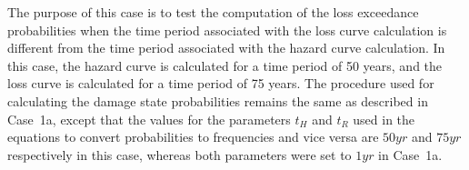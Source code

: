 The purpose of this case is to test the computation of the loss exceedance probabilities when the time period associated with the loss curve calculation is different from the time period associated with the hazard curve calculation. In this case, the hazard curve is calculated for a time period of 50 years, and the loss curve is calculated for a time period of 75 years. The procedure used for calculating the damage state probabilities remains the same as described in Case~1a, except that the values for the parameters $t_H$ and $t_R$ used in the equations to convert probabilities to frequencies and vice versa are $50 yr$ and $75 yr$ respectively in this case, whereas both parameters were set to $1 yr$ in Case~1a.